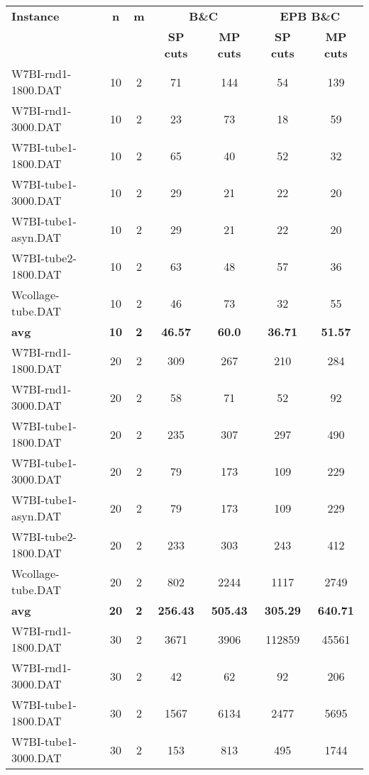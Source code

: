 \begin{table}[!ht]
\centering
\hspace*{-1cm}\begin{tabular}{lcccccc}
\toprule
\textbf{Instance} & \textbf{n} & \textbf{m} & \multicolumn{2}{c}{\textbf{B\&C}}  & \multicolumn{2}{c}{\textbf{EPB B\&C}}
\\
\cmidrule(r){4-5} \cmidrule(r){6-7} 
~ & ~ & ~ & \textbf{SP cuts} &\textbf{MP cuts} & \textbf{SP cuts} &\textbf{MP cuts} \\
\midrule

W7BI-rnd1-1800.DAT & 10 & 2 & 71 & 144 & 54 & 139 \\
W7BI-rnd1-3000.DAT & 10 & 2 & 23 & 73 & 18 & 59 \\
W7BI-tube1-1800.DAT & 10 & 2 & 65 & 40 & 52 & 32 \\
W7BI-tube1-3000.DAT & 10 & 2 & 29 & 21 & 22 & 20 \\
W7BI-tube1-asyn.DAT & 10 & 2 & 29 & 21 & 22 & 20 \\
W7BI-tube2-1800.DAT & 10 & 2 & 63 & 48 & 57 & 36 \\
Wcollage-tube.DAT & 10 & 2 & 46 & 73 & 32 & 55 \\
\cline{1-7} \textbf{avg} & \textbf{10} & \textbf{2} & \textbf{46.57} & \textbf{60.0} & \textbf{36.71} & \textbf{51.57} \\ \cline{1-7}
W7BI-rnd1-1800.DAT & 20 & 2 & 309 & 267 & 210 & 284 \\
W7BI-rnd1-3000.DAT & 20 & 2 & 58 & 71 & 52 & 92 \\
W7BI-tube1-1800.DAT & 20 & 2 & 235 & 307 & 297 & 490 \\
W7BI-tube1-3000.DAT & 20 & 2 & 79 & 173 & 109 & 229 \\
W7BI-tube1-asyn.DAT & 20 & 2 & 79 & 173 & 109 & 229 \\
W7BI-tube2-1800.DAT & 20 & 2 & 233 & 303 & 243 & 412 \\
Wcollage-tube.DAT & 20 & 2 & 802 & 2244 & 1117 & 2749 \\
\cline{1-7} \textbf{avg} & \textbf{20} & \textbf{2} & \textbf{256.43} & \textbf{505.43} & \textbf{305.29} & \textbf{640.71} \\ \cline{1-7}
W7BI-rnd1-1800.DAT & 30 & 2 & 3671 & 3906 & 112859 & 45561 \\
W7BI-rnd1-3000.DAT & 30 & 2 & 42 & 62 & 92 & 206 \\
W7BI-tube1-1800.DAT & 30 & 2 & 1567 & 6134 & 2477 & 5695 \\
W7BI-tube1-3000.DAT & 30 & 2 & 153 & 813 & 495 & 1744 \\

\end{tabular}
\end{table}
